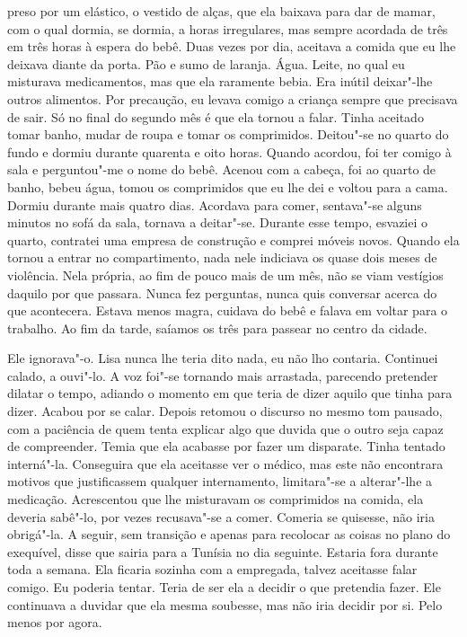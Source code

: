 preso por um elástico, o vestido de alças, que ela baixava para dar de
mamar, com o qual dormia, se dormia, a horas irregulares, mas sempre
acordada de três em três horas à espera do bebê. Duas vezes por dia,
aceitava a comida que eu lhe deixava diante da porta. Pão e sumo de
laranja. Água. Leite, no qual eu misturava medicamentos, mas que ela
raramente bebia. Era inútil deixar"-lhe outros alimentos. Por precaução,
eu levava comigo a criança sempre que precisava de sair. Só no final do
segundo mês é que ela tornou a falar. Tinha aceitado tomar banho, mudar
de roupa e tomar os comprimidos. Deitou"-se no quarto do fundo e dormiu
durante quarenta e oito horas. Quando acordou, foi ter comigo à sala e
perguntou"-me o nome do bebê. Acenou com a cabeça, foi ao quarto de
banho, bebeu água, tomou os comprimidos que eu lhe dei e voltou para a
cama. Dormiu durante mais quatro dias. Acordava para comer, sentava"-se
alguns minutos no sofá da sala, tornava a deitar"-se. Durante esse
tempo, esvaziei o quarto, contratei uma empresa de construção e comprei
móveis novos. Quando ela tornou a entrar no compartimento, nada nele
indiciava os quase dois meses de violência. Nela própria, ao fim de
pouco mais de um mês, não se viam vestígios daquilo por que passara.
Nunca fez perguntas, nunca quis conversar acerca do que acontecera.
Estava menos magra, cuidava do bebê e falava em voltar para o trabalho.
Ao fim da tarde, saíamos os três para passear no centro da cidade.

Ele ignorava"-o. Lisa nunca lhe teria dito nada, eu não lho contaria.
Continuei calado, a ouvi"-lo. A voz foi"-se tornando mais arrastada,
parecendo pretender dilatar o tempo, adiando o momento em que teria de
dizer aquilo que tinha para dizer. Acabou por se calar. Depois retomou o
discurso no mesmo tom pausado, com a paciência de quem tenta explicar
algo que duvida que o outro seja capaz de compreender. Temia que ela
acabasse por fazer um disparate. Tinha tentado interná"-la. Conseguira
que ela aceitasse ver o médico, mas este não encontrara motivos que
justificassem qualquer internamento, limitara"-se a alterar"-lhe a
medicação. Acrescentou que lhe misturavam os comprimidos na comida, ela
deveria sabê"-lo, por vezes recusava"-se a comer. Comeria se quisesse,
não iria obrigá"-la. A seguir, sem transição e apenas para recolocar as
coisas no plano do exequível, disse que sairia para a Tunísia no dia
seguinte. Estaria fora durante toda a semana. Ela ficaria sozinha com a
empregada, talvez aceitasse falar comigo. Eu poderia tentar. Teria de
ser ela a decidir o que pretendia fazer. Ele continuava a duvidar que
ela mesma soubesse, mas não iria decidir por si. Pelo menos por agora.

